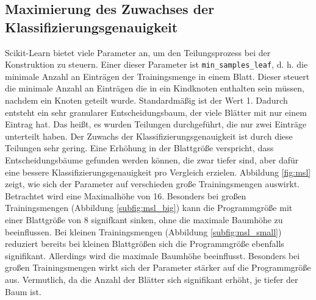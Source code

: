 \subsection{Maximierung des Zuwachses der Klassifizierungsgenauigkeit}
Scikit-Learn bietet viele Parameter an, um den Teilungsprozess bei der Konstruktion zu steuern. Einer dieser Parameter ist \texttt{min\_samples\_leaf}, d. h. die minimale Anzahl an Einträgen der Trainingsmenge
in einem Blatt. Dieser steuert die minimale Anzahl an Einträgen die in ein Kindknoten enthalten sein müssen, nachdem ein Knoten geteilt wurde. Standardmäßig ist der Wert 1. Dadurch entsteht ein sehr granularer
Entscheidungsbaum, der viele Blätter mit nur einem Eintrag hat. Das heißt, es wurden Teilungen durchgeführt, die nur zwei Einträge unterteilt haben. Der Zuwachs der Klassifizierungsgenauigkeit ist durch diese
Teilungen sehr gering. Eine Erhöhung in der Blattgröße verspricht, dass Entscheidungsbäume gefunden werden können, die zwar tiefer sind, aber dafür eine bessere Klassifizierungsgenauigkeit pro Vergleich erzielen.
\newline
\newline
Abbildung \ref{fig:msl} zeigt, wie sich der Parameter auf verschieden große Trainingsmengen auswirkt. Betrachtet wird eine Maximalhöhe von 16. Besonders bei großen Trainingsmengen (Abbildung \ref{subfig:msl_big})
kann die Programmgröße mit einer Blattgröße von 8 signifkant sinken, ohne die maximale Baumhöhe zu beeinflussen. Bei kleinen Trainingsmengen (Abbildung \ref{subfig:msl_small}) reduziert bereits bei kleinen Blattgrößen
sich die Programmgröße ebenfalls signifikant. Allerdings wird die maximale Baumhöhe beeinflusst. Besonders bei großen Trainingsmengen wirkt sich der Parameter stärker auf die Programmgröße aus.
Vermutlich, da die Anzahl der Blätter sich signifikant erhöht, je tiefer der Baum ist.
